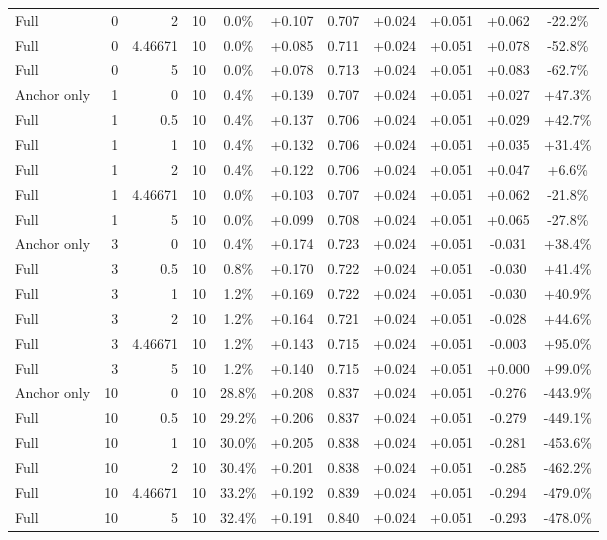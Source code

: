 \begin{table}[htbp]
\begin{tabular}{lrrrccccccc}
Full & 0 & 2 & 10 & 0.0\% & +0.107 & 0.707 & +0.024 & +0.051 & +0.062 & -22.2\% \\
Full & 0 & 4.46671 & 10 & 0.0\% & +0.085 & 0.711 & +0.024 & +0.051 & +0.078 & -52.8\% \\
Full & 0 & 5 & 10 & 0.0\% & +0.078 & 0.713 & +0.024 & +0.051 & +0.083 & -62.7\% \\
Anchor only & 1 & 0 & 10 & 0.4\% & +0.139 & 0.707 & +0.024 & +0.051 & +0.027 & +47.3\% \\
Full & 1 & 0.5 & 10 & 0.4\% & +0.137 & 0.706 & +0.024 & +0.051 & +0.029 & +42.7\% \\
Full & 1 & 1 & 10 & 0.4\% & +0.132 & 0.706 & +0.024 & +0.051 & +0.035 & +31.4\% \\
Full & 1 & 2 & 10 & 0.4\% & +0.122 & 0.706 & +0.024 & +0.051 & +0.047 & +6.6\% \\
Full & 1 & 4.46671 & 10 & 0.0\% & +0.103 & 0.707 & +0.024 & +0.051 & +0.062 & -21.8\% \\
Full & 1 & 5 & 10 & 0.0\% & +0.099 & 0.708 & +0.024 & +0.051 & +0.065 & -27.8\% \\
Anchor only & 3 & 0 & 10 & 0.4\% & +0.174 & 0.723 & +0.024 & +0.051 & -0.031 & +38.4\% \\
Full & 3 & 0.5 & 10 & 0.8\% & +0.170 & 0.722 & +0.024 & +0.051 & -0.030 & +41.4\% \\
Full & 3 & 1 & 10 & 1.2\% & +0.169 & 0.722 & +0.024 & +0.051 & -0.030 & +40.9\% \\
Full & 3 & 2 & 10 & 1.2\% & +0.164 & 0.721 & +0.024 & +0.051 & -0.028 & +44.6\% \\
Full & 3 & 4.46671 & 10 & 1.2\% & +0.143 & 0.715 & +0.024 & +0.051 & -0.003 & +95.0\% \\
Full & 3 & 5 & 10 & 1.2\% & +0.140 & 0.715 & +0.024 & +0.051 & +0.000 & +99.0\% \\
Anchor only & 10 & 0 & 10 & 28.8\% & +0.208 & 0.837 & +0.024 & +0.051 & -0.276 & -443.9\% \\
Full & 10 & 0.5 & 10 & 29.2\% & +0.206 & 0.837 & +0.024 & +0.051 & -0.279 & -449.1\% \\
Full & 10 & 1 & 10 & 30.0\% & +0.205 & 0.838 & +0.024 & +0.051 & -0.281 & -453.6\% \\
Full & 10 & 2 & 10 & 30.4\% & +0.201 & 0.838 & +0.024 & +0.051 & -0.285 & -462.2\% \\
Full & 10 & 4.46671 & 10 & 33.2\% & +0.192 & 0.839 & +0.024 & +0.051 & -0.294 & -479.0\% \\
Full & 10 & 5 & 10 & 32.4\% & +0.191 & 0.840 & +0.024 & +0.051 & -0.293 & -478.0\% \\

\end{tabular}
\end{table}
